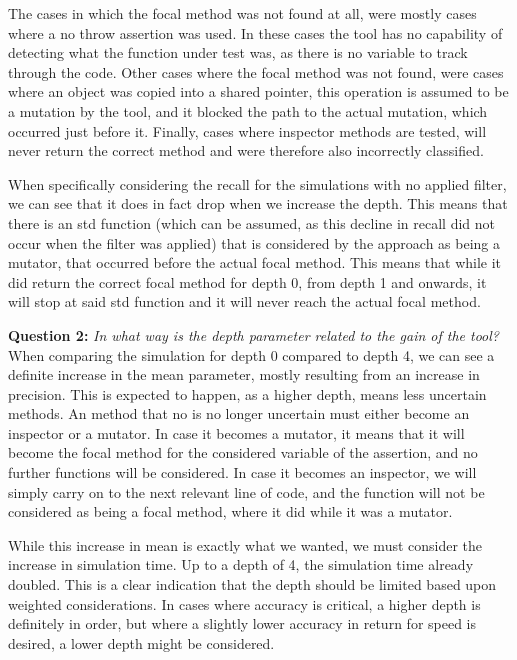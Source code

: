 \documentclass[11pt]{article}
\begin{document}
\begin{multicols}{2}
The cases in which the focal method was not found at all, were mostly cases where a no throw assertion was used. In these cases the tool has no capability of detecting what the function under test was, as there is no variable to track through the code. Other cases where the focal method was not found, were cases where an object was copied into a shared pointer, this operation is assumed to be a mutation by the tool, and it blocked the path to the actual mutation, which occurred just before it. Finally, cases where inspector methods are tested, will never return the correct method and were therefore also incorrectly classified.

When specifically considering the recall for the simulations with no applied filter, we can see that it does in fact drop when we increase the depth. This means that there is an std function (which can be assumed, as this decline in recall did not occur when the filter was applied) that is considered by the approach as being a mutator, that occurred before the actual focal method. This means that while it did return the correct focal method for depth 0, from depth 1 and onwards, it will stop at said std function and it will never reach the actual focal method.

\textbf{Question 2:} \textit{In what way is the depth parameter related to the gain of the tool?}\\
When comparing the simulation for depth 0 compared to depth 4, we can see a definite increase in the mean parameter, mostly resulting from an increase in precision. This is expected to happen, as a higher depth, means less uncertain methods. An method that no is no longer uncertain must either become an inspector or a mutator. In case it becomes a mutator, it means that it will become the focal method for the considered variable of the assertion, and no further functions will be considered. In case it becomes an inspector, we will simply carry on to the next relevant line of code, and the function will not be considered as being a focal method, where it did while it was a mutator.

While this increase in mean is exactly what we wanted, we must consider the increase in simulation time. Up to a depth of 4, the simulation time already doubled. This is a clear indication that the depth should be limited based upon weighted considerations. In cases where accuracy is critical, a higher depth is definitely in order, but where a slightly lower accuracy in return for speed is desired, a lower depth might be considered. 


\end{multicols}
\end{document}
